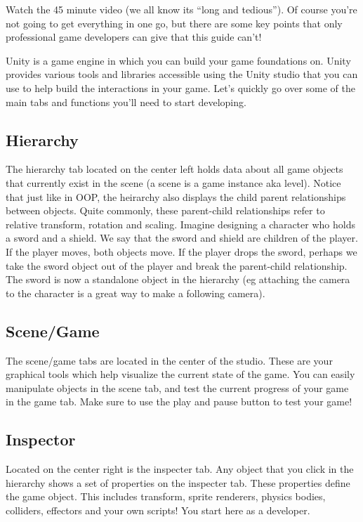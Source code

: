 \documentclass[12pt]{article}
\begin{document}
Watch the 45 minute video (we all know its ``long and tedious''). Of course you're not going to get everything in one go, but there are some key points that only professional game developers can give that this guide can't!

Unity is a game engine in which you can build your game foundations on. Unity provides various tools and libraries accessible using the Unity studio that you can use to help build the interactions in your game. Let's quickly go over some of the main tabs and functions you'll need to start developing.

\subsection{Hierarchy} 

The hierarchy tab located on the center left holds data about all game objects that currently exist in the scene (a scene is a game instance aka level). Notice that just like in OOP, the heirarchy also displays the child parent relationships between objects. Quite commonly, these parent-child relationships refer to relative transform, rotation and scaling. Imagine designing a character who holds a sword and a shield. We say that the sword and shield are children of the player. If the player moves, both objects move. If the player drops the sword, perhaps we take the sword object out of the player and break the parent-child relationship. The sword is now a standalone object in the hierarchy (eg attaching the camera to the character is a great way to make a following camera).

\subsection{Scene/Game}
The scene/game tabs are located in the center of the studio. These are your graphical tools which help visualize the current state of the game. You can easily manipulate objects in the scene tab, and test the current progress of your game in the game tab. Make sure to use the play and pause button to test your game!

\subsection{Inspector}
Located on the center right is the inspecter tab. Any object that you click in the hierarchy shows a set of properties on the inspecter tab. These properties define the game object. This includes transform, sprite renderers, physics bodies, colliders, effectors and your own scripts! You start here as a developer.
\end{document}
